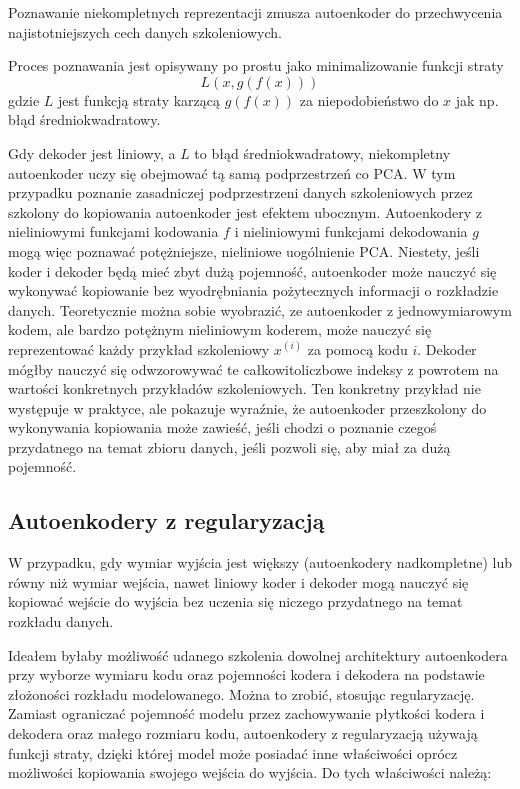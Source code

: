 \documentclass[12pt]{mwbk}
\theoremstyle{plain}
\theoremstyle{definition}
\theoremstyle{remark}
\begin{document}
Poznawanie niekompletnych reprezentacji zmusza autoenkoder do przechwycenia najistotniejszych cech danych szkoleniowych.

Proces poznawania jest opisywany po prostu jako minimalizowanie funkcji straty
$$L(x, g(f(x)))$$
gdzie $L$ jest funkcją straty karzącą $g(f(x))$ za niepodobieństwo do $x$ jak np. błąd średniokwadratowy.

Gdy dekoder jest liniowy, a $L$ to błąd średniokwadratowy, niekompletny autoenkoder uczy się obejmować tą samą podprzestrzeń co PCA. W tym przypadku poznanie zasadniczej podprzestrzeni danych szkoleniowych przez szkolony do kopiowania autoenkoder jest efektem ubocznym. Autoenkodery z nieliniowymi funkcjami kodowania $f$ i nieliniowymi funkcjami dekodowania $g$ mogą więc poznawać potężniejsze, nieliniowe uogólnienie PCA. Niestety, jeśli koder i dekoder będą mieć zbyt dużą pojemność, autoenkoder może nauczyć się wykonywać kopiowanie bez wyodrębniania pożytecznych informacji o rozkładzie danych. Teoretycznie można sobie wyobrazić, ze autoenkoder z jednowymiarowym kodem, ale bardzo potężnym nieliniowym koderem, może nauczyć się reprezentować każdy przykład szkoleniowy $x^{(i)}$ za pomocą kodu $i$. Dekoder mógłby nauczyć się odwzorowywać te całkowitoliczbowe indeksy z powrotem na wartości konkretnych przykładów szkoleniowych. Ten konkretny przykład nie występuje w praktyce, ale pokazuje wyraźnie, że autoenkoder przeszkolony do wykonywania kopiowania może zawieść, jeśli chodzi o poznanie czegoś przydatnego na temat zbioru danych, jeśli pozwoli się, aby miał za dużą pojemność.

\subsection{Autoenkodery z regularyzacją}

\cite{goodfellow}

W przypadku, gdy wymiar wyjścia jest większy (autoenkodery nadkompletne) lub równy niż wymiar wejścia, nawet liniowy koder i dekoder mogą nauczyć się kopiować wejście do wyjścia bez uczenia się niczego przydatnego na temat rozkładu danych.

Ideałem byłaby możliwość udanego szkolenia dowolnej architektury autoenkodera przy wyborze wymiaru kodu oraz pojemności kodera i dekodera na podstawie złożoności rozkładu modelowanego. Można to zrobić, stosując regularyzację. Zamiast ograniczać pojemność modelu przez zachowywanie płytkości kodera i dekodera oraz małego rozmiaru kodu, autoenkodery z regularyzacją używają funkcji straty, dzięki której model może posiadać inne właściwości oprócz możliwości kopiowania swojego wejścia do wyjścia. Do tych właściwości należą:
\end{document}
